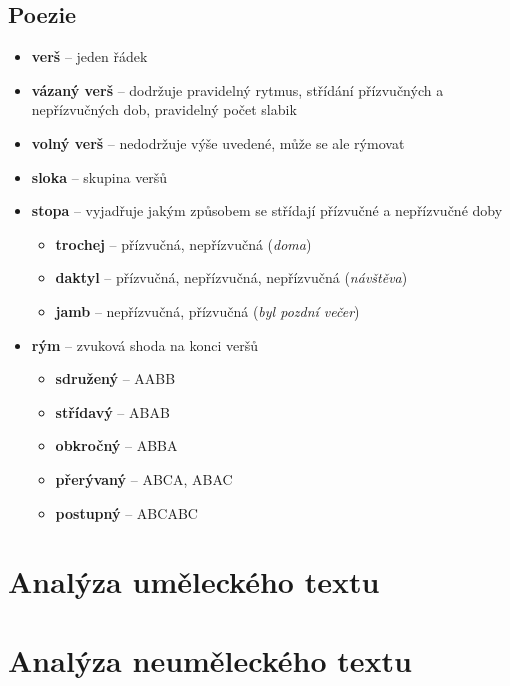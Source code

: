 \subsection{Poezie}
\begin{itemize}
\item[] \textbf{verš} -- jeden řádek
\item[] \textbf{vázaný verš} -- dodržuje pravidelný rytmus, střídání přízvučných a nepřízvučných dob, pravidelný počet slabik
\item[] \textbf{volný verš} -- nedodržuje výše uvedené, může se ale rýmovat
\item[] \textbf{sloka} -- skupina veršů
\item[] \textbf{stopa} -- vyjadřuje jakým způsobem se střídají přízvučné a nepřízvučné doby
\begin{itemize}
\item \textbf{trochej} -- přízvučná, nepřízvučná (\textit{doma})
\item \textbf{daktyl} -- přízvučná, nepřízvučná, nepřízvučná (\textit{návštěva})
\item \textbf{jamb} -- nepřízvučná, přízvučná (\textit{byl pozdní večer})
\end{itemize}
\item[] \textbf{rým} -- zvuková shoda na konci veršů
\begin{itemize}
\item \textbf{sdružený} -- AABB
\item \textbf{střídavý} -- ABAB
\item \textbf{obkročný} -- ABBA
\item \textbf{přerývaný} -- ABCA, ABAC
\item \textbf{postupný} -- ABCABC

\end{itemize}
\end{itemize}

\newpage
\section{Analýza uměleckého textu}

\section{Analýza neuměleckého textu}



